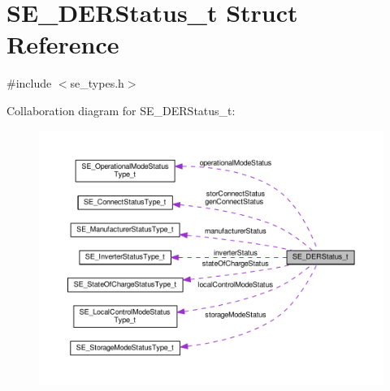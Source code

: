 \hypertarget{structSE__DERStatus__t}{}\section{S\+E\+\_\+\+D\+E\+R\+Status\+\_\+t Struct Reference}
\label{structSE__DERStatus__t}


{\ttfamily \#include $<$se\+\_\+types.\+h$>$}



Collaboration diagram for S\+E\+\_\+\+D\+E\+R\+Status\+\_\+t\+:\nopagebreak
\begin{figure}[H]
\begin{center}
\leavevmode
\includegraphics[width=350pt]{structSE__DERStatus__t__coll__graph}
\end{center}
\end{figure}
